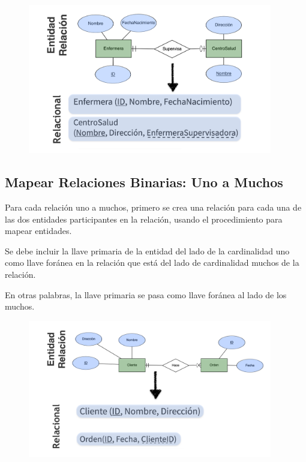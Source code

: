 \documentclass[12pt, fleqn]{report}                             %
\theoremstyle{break}                                            %
\begin{document}
                \begin{figure}[h]
                    \centering
                    \includegraphics[width=0.95\textwidth]{MapeoRelacionesBinariasUnoUno}
                \end{figure}

                


            \clearpage
            \subsection{Mapear Relaciones Binarias: Uno a Muchos}

                Para cada relación uno a muchos, primero se crea una relación para cada una de las dos
                entidades participantes en la relación, usando el procedimiento para mapear entidades.

                Se debe incluir la llave primaria de la entidad del lado de la cardinalidad uno como llave
                foránea en la relación que está del lado de cardinalidad muchos de la relación.

                En otras palabras, la llave primaria se pasa como llave foránea al lado de los muchos.

                \begin{figure}[h]
                    \centering
                    \includegraphics[width=0.95\textwidth]{MapeoRelacionesBinariasUnoMuchos}
                \end{figure}
\end{document}
